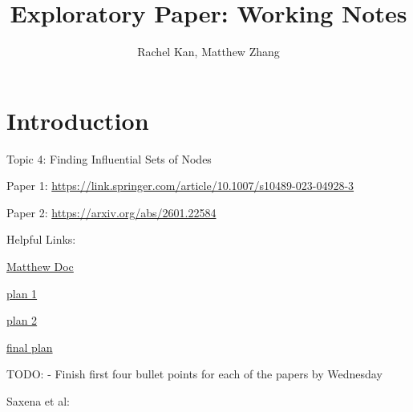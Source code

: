 \documentclass[11pt]{article}
\title{Exploratory Paper: Working Notes}
\author{Rachel Kan, Matthew Zhang}
\date{}
\begin{document}
\maketitle

\section{Introduction}

Topic 4: Finding Influential Sets of Nodes

Paper 1: \url{https://link.springer.com/article/10.1007/s10489-023-04928-3}

Paper 2: \url{https://arxiv.org/abs/2601.22584}

Helpful Links: 

\href{https://docs.google.com/document/d/12Le69oe9Um64rV3BBx2q8lIQHXhlx-Nq2LkYXV_aMfk/edit?usp=sharing}{Matthew Doc}

\href{https://claude.ai/artifact/NVdrHQPTBqBgPYuaESmRCN#4c74ad97-f9e3.md70b2w91by.76}{plan 1}

\href{https://claude.ai/artifact/Qpr1caadaoqcgTiJXQb1mg#3e1253d9-9b3b}{plan 2}

\href{https://claude.ai/code/artifact/ae0f7265-30e0-4af7-b6f0-da0f6a7db3c3#628e8897-df81.md70b2w91by.2381}{final plan}

TODO:
- Finish first four bullet points for each of the papers by Wednesday


Saxena et al:
\end{document}
